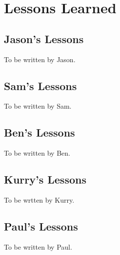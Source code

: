 \documentclass{book}
\begin{document}
\section{Lessons Learned}
\label{sec:lessons}

\subsection{Jason's Lessons}
\label{sub:jasons-lessons}

To be written by Jason.

\subsection{Sam's Lessons}
\label{sub:sams-lessons}

To be written by Sam.

\subsection{Ben's Lessons}
\label{sub:bens-lessons}

To be written by Ben.

\subsection{Kurry's Lessons}
\label{sub:kurrys-lessons}

To be wrtten by Kurry.

\subsection{Paul's Lessons}
\label{sub:pauls-lessons}

To be written by Paul.

\appendix
\end{document}
